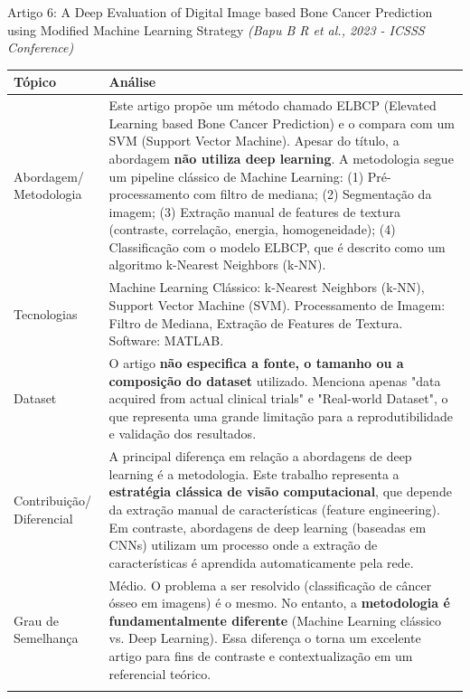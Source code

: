 \documentclass[12pt, a4paper]{article}
\begin{document}
\begin{fichabox}{Artigo 6: A Deep Evaluation of Digital Image based Bone Cancer Prediction using Modified Machine Learning Strategy}
\textit{(Bapu B R et al., 2023 - ICSSS Conference)}

\begin{longtable}{@{} B L{10.5cm} @{}}
    \toprule
    \textbf{Tópico} & \textbf{Análise} \\
    \midrule
    \endhead
    
    Abordagem/ Metodologia & Este artigo propõe um método chamado ELBCP (Elevated Learning based Bone Cancer Prediction) e o compara com um SVM (Support Vector Machine). Apesar do título, a abordagem \textbf{não utiliza deep learning}. A metodologia segue um pipeline clássico de Machine Learning: (1) Pré-processamento com filtro de mediana; (2) Segmentação da imagem; (3) Extração manual de features de textura (contraste, correlação, energia, homogeneidade); (4) Classificação com o modelo ELBCP, que é descrito como um algoritmo k-Nearest Neighbors (k-NN). \\
    \addlinespace
    
    Tecnologias & Machine Learning Clássico: k-Nearest Neighbors (k-NN), Support Vector Machine (SVM). Processamento de Imagem: Filtro de Mediana, Extração de Features de Textura. Software: MATLAB. \\
    \addlinespace
    
    Dataset & O artigo \textbf{não especifica a fonte, o tamanho ou a composição do dataset} utilizado. Menciona apenas "data acquired from actual clinical trials" e "Real-world Dataset", o que representa uma grande limitação para a reprodutibilidade e validação dos resultados. \\
    \addlinespace
    
    Contribuição/ Diferencial & A principal diferença em relação a abordagens de deep learning é a metodologia. Este trabalho representa a \textbf{estratégia clássica de visão computacional}, que depende da extração manual de características (feature engineering). Em contraste, abordagens de deep learning (baseadas em CNNs) utilizam um processo onde a extração de características é aprendida automaticamente pela rede. \\
    \addlinespace
    
    Grau de Semelhança & Médio. O problema a ser resolvido (classificação de câncer ósseo em imagens) é o mesmo. No entanto, a \textbf{metodologia é fundamentalmente diferente} (Machine Learning clássico vs. Deep Learning). Essa diferença o torna um excelente artigo para fins de contraste e contextualização em um referencial teórico. \\
    \addlinespace
    

\end{longtable}
\end{fichabox}
\end{document}
